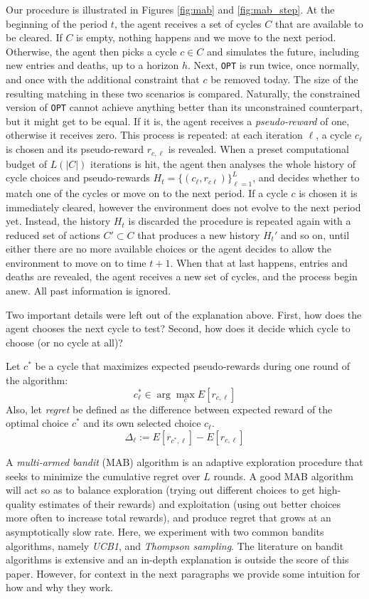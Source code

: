 \begin{itemize}
Our procedure is illustrated in Figures \ref{fig:mab} and \ref{fig:mab_step}. At the beginning of the period $t$, the agent receives a set of cycles $C$ that are available to be cleared. If $C$ is empty, nothing happens and we move to the next period. Otherwise, the agent then picks a cycle $c \in C$ and simulates the future, including new entries and deaths, up to a horizon $h$. Next, \texttt{OPT} is run twice, once normally, and once with the additional constraint that $c$ be removed today. The size of the resulting matching in these two scenarios is compared. Naturally, the constrained version of \texttt{OPT} cannot achieve anything better than its unconstrained counterpart, but it might get to be equal. If it is, the agent receives a \emph{pseudo-reward} of one, otherwise it receives zero. This process is repeated: at each iteration $\ell$, a cycle $c_{\ell}$ is chosen and its pseudo-reward $r_{c, \ell}$ is revealed. When a preset computational budget of $L(|C|)$ iterations is hit, the agent then analyses the whole history of cycle choices and pseudo-rewards $H_{t} = \{ (c_{\ell}, r_{c\ell} ) \}_{\ell=1}^{L}$, and decides whether to match one of the cycles or move on to the next period. If a cycle $c$ is chosen it is immediately cleared, however the environment does not evolve to the next period yet. Instead, the history $H_t$ is discarded the procedure is repeated again with a reduced set of actions $C' \subset C$ that produces a new history $H_t'$ and so on, until either there are no more available choices or the agent decides to allow the environment to move on to time $t+1$. When that at last happens, entries and deaths are revealed, the agent receives a new set of cycles, and the process begin anew. All past information is ignored.


Two important details were left out of the explanation above. First, how does the agent chooses the next cycle to test? Second, how does it decide which cycle to choose (or no cycle at all)? 

Let $c^{*}$ be a cycle that maximizes expected pseudo-rewards during one round of the algorithm:
$$c_{\ell}^{*} \in \arg\max_{c} E[r_{c,\ell}] $$
 Also, let \emph{regret} be defined as the difference between expected reward of the optimal choice $c^*$ and its own selected choice $c_{\ell}$.
 $$\Delta_\ell := E[r_{c^{*},\ell}] - E[r_{c,\ell}]$$
 
 A \emph{multi-armed bandit} (MAB) algorithm is an adaptive exploration procedure that seeks to minimize the cumulative regret over $L$ rounds. A good MAB algorithm will act so as to balance exploration (trying out different choices to get high-quality estimates of their rewards) and exploitation (using out better choices more often to increase total rewards), and produce regret that grows at an asymptotically slow rate. Here, we experiment with two common bandits algorithms, namely \emph{UCB1}, and \emph{Thompson sampling}. The literature on bandit algorithms is extensive and an in-depth explanation is outside the score of this paper. However, for context in the next paragraphs we provide some intuition for how and why they work.
 

\end{itemize}

